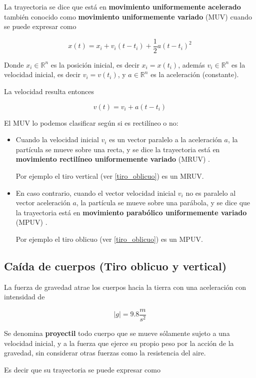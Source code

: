 La trayectoria se dice que está en \textbf{movimiento uniformemente acelerado} también conocido como \textbf{movimiento uniformemente variado} (MUV)  cuando se puede expresar como

$$ x(t) = x_i + v_i (t-t_i) + \frac{1}{2}a (t-t_i)^2 $$

Donde $x_i \in \mathbb{R}^n$ es la posición inicial, es decir $x_i = x(t_i)$, además $v_i \in \mathbb{R}^n$ es la velocidad inicial, es decir $v_i = v(t_i)$, y $a \in \mathbb{R}^n$ es la aceleración (constante).

La velocidad resulta entonces

$$ v(t) = v_i + a(t-t_i) $$

El MUV lo podemos clasificar según si es rectilíneo o no:

\begin{itemize}
\item Cuando la velocidad inicial $v_i$ es un vector paralelo a la aceleración $a$, la partícula se mueve sobre una recta, y se dice la trayectoria está en \textbf{movimiento rectilíneo uniformemente variado} (MRUV) .  

Por ejemplo el tiro vertical (ver \ref{tiro_oblicuo}) es un MRUV.

\item En caso contrario, cuando el vector velocidad inicial $v_i$ no es paralelo al vector aceleración $a$, la partícula se mueve sobre una parábola, y se dice que la trayectoria está en \textbf{movimiento parabólico uniformemente variado} (MPUV) .  

Por ejemplo el tiro oblicuo (ver \ref{tiro_oblicuo}) es un MPUV.
\end{itemize}

\subsection{Caída de cuerpos (Tiro oblicuo y vertical)}

La fuerza de gravedad atrae los cuerpos hacia la tierra con una aceleración con intensidad de 

$$ |g| = 9.8 \frac{m}{s^2}$$

Se denomina \textbf{proyectil} todo cuerpo que se mueve sólamente sujeto a una velocidad inicial, y a la fuerza que ejerce su propio peso por la acción de la gravedad, sin considerar otras fuerzas como la resistencia del aire.

Es decir que su trayectoria se puede expresar como

